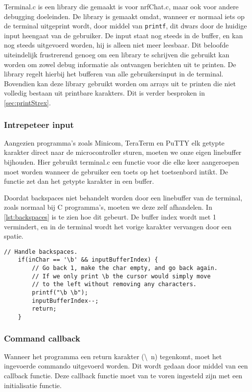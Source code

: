 
Terminal.c is een library die gemaakt is voor nrfChat.c, maar ook voor andere debugging doeleinden. De library is gemaakt omdat, wanneer er normaal iets op de terminal uitgeprint wordt, door middel van \texttt{printf}, dit dwars door de huidige input heengaat van de gebruiker. De input staat nog steeds in de buffer, en kan nog steeds uitgevoerd worden, hij is alleen niet meer leesbaar. Dit beloofde uiteindelijk frustrerend genoeg om een library te schrijven die gebruikt kan worden om zowel debug informatie als ontvangen berichten uit te printen. De library regelt hierbij het bufferen van alle gebruikersinput in de terminal. Bovendien kan deze library gebruikt worden om arrays uit te printen die niet volledig bestaan uit printbare karakters. Dit is verder besproken in \autoref{sec:printStrex}.

\subsubsection{Intrepeteer input}
Aangezien programma's zoals Minicom, TeraTerm en PuTTY elk getypte karakter direct naar de microcontroller sturen, moeten we onze eigen linebuffer bijhouden. Hier gebruikt terminal.c een functie voor die elke keer aangeroepen moet worden wanneer de gebruiker een toets op het toetsenbord intikt. De functie zet dan het getypte karakter in een buffer. 

Doordat backspaces niet behandelt worden door een linebuffer van de terminal, zoals normaal bij C programma's, moeten we deze zelf afhandelen. In \autoref{lst:backspaces} is te zien hoe dit gebeurt. De buffer index wordt met 1 vermindert, en in de terminal wordt het vorige karakter vervangen door een spatie.



\begin{lstlisting}[caption={Backspaces afhandelen},captionpos=b,label={lst:backspaces},style=c,xleftmargin=.\textwidth,xrightmargin=.\textwidth]
    // Handle backspaces.
    if(inChar == '\b' && inputBufferIndex) {
        // Go back 1, make the char empty, and go back again.
        // If we only print \b the cursor would simply move
        // to the left without removing any characters.
        printf("\b \b");
        inputBufferIndex--;
        return;
    }
\end{lstlisting}

\subsubsection{Command callback}
Wanneer het programma een return karakter (\textbackslash~n) tegenkomt, moet het ingevoerde commando uitgevoerd worden. Dit wordt gedaan door middel van een callback functie. Deze callback functie moet van te voren ingesteld zijn met een initialisatie functie.

